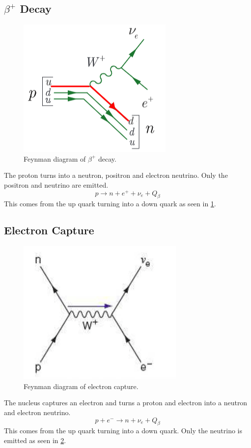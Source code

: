 \vspace{12mm}
\subsection{$β^{+}$ Decay}
\begin{figure}
\centering
\vspace{-10mm}
\includegraphics[width = .35\textwidth]{beta_plus_decay.png}
\caption{Feynman diagram of $β^{+}$ decay.}
\label{fig: beta_plus_decay}
\end{figure}
The proton turns into a neutron, positron and electron neutrino. Only the positron and neutrino are emitted.
\begin{equation}
    p \rightarrow n + e^{+} + \nu_{e} + Q_β
\end{equation}
This comes from the up quark turning into a down quark as seen in \cref{fig: beta_plus_decay}.


\vspace{10mm}
\subsection{Electron Capture}
\begin{figure}
\centering
\includegraphics[width = .35\textwidth]{electron_capture.png}
\caption{Feynman diagram of electron capture.}
\label{fig: electron_capture}
\end{figure}

The nucleus captures an electron and turns a proton and electron into a neutron and electron neutrino. 
\begin{equation}
    p + e^{-} \rightarrow n + \nu_{e} + Q_β
\end{equation}
This comes from the up quark turning into a down quark. Only the neutrino is emitted as seen in \cref{fig: electron_capture}.

